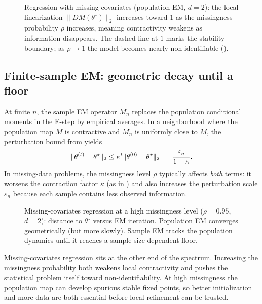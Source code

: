 \documentclass[11pt]{article}
\begin{document}
\begin{figure}[t]
  \centering
  
  \caption{Regression with missing covariates (population EM, $d=2$): the local linearization $\|DM(\theta^\star)\|_2$ increases toward $1$ as the missingness probability $\rho$ increases, meaning contractivity weakens as information disappears. The dashed line at $1$ marks the stability boundary; as $\rho\to 1$ the model becomes nearly non-identifiable ().}
  \label{fig:em-missingness-contraction}
\end{figure}

\subsection{Finite-sample EM: geometric decay until a floor}
\label{subsec:missing-covariates-finite-sample}

At finite $n$, the sample EM operator $M_n$ replaces the population conditional moments in the E-step by empirical averages.
In a neighborhood where the population map $M$ is contractive and $M_n$ is uniformly close to $M$, the perturbation bound from  yields
\[
\lVert\theta^{(t)}-\theta^\star\rVert_2
\le
\kappa^t\lVert\theta^{(0)}-\theta^\star\rVert_2
\;+\;
\frac{\varepsilon_n}{1-\kappa}.
\]
In missing-data problems, the missingness level $\rho$ typically affects \emph{both} terms:
it worsens the contraction factor $\kappa$ (as in ) and also increases the perturbation scale $\varepsilon_n$ because each sample contains less observed information.

\begin{figure}[t]
  \centering
  
  \caption{Missing-covariates regression at a high missingness level ($\rho=0.95$, $d=2$): distance to $\theta^\star$ versus EM iteration. Population EM converges geometrically (but more slowly). Sample EM tracks the population dynamics until it reaches a sample-size-dependent floor.}
  \label{fig:em-missing-covariates-pop-vs-sample}
\end{figure}

Missing-covariates regression sits at the other end of the spectrum.
Increasing the missingness probability both weakens local contractivity and pushes the statistical problem itself toward non-identifiability.
At high missingness the population map can develop spurious stable fixed points, so better initialization and more data are both essential before local refinement can be trusted.
\end{document}
